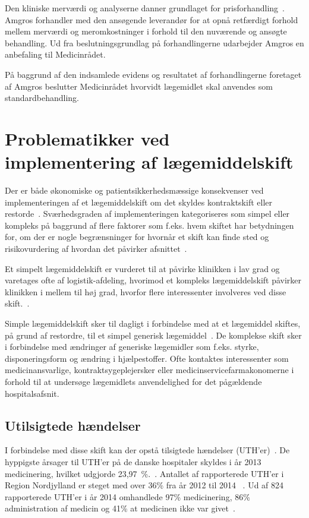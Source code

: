 Den kliniske merværdi og analyserne danner grundlaget for prisforhandling~\citep{Amgros2017, Amgros2017a}. Amgros forhandler med den ansøgende leverandør for at opnå retfærdigt forhold mellem merværdi og meromkostninger i forhold til den nuværende og ansøgte behandling. Ud fra beslutningsgrundlag på forhandlingerne udarbejder Amgros en anbefaling til Medicinrådet.~\citep{Amgros2017, Amgros2017a}

På baggrund af den indsamlede evidens og resultatet af forhandlingerne foretaget af Amgros beslutter Medicinrådet hvorvidt lægemidlet skal anvendes som standardbehandling.~\citep{Amgros2017a} 

\section{Problematikker ved implementering af lægemiddelskift}
Der er både økonomiske og patientsikkerhedsmæssige konsekvenser ved implementeringen af et lægemiddelskift om det skyldes kontraktskift eller restorde~\citep{Amgros2015}. Sværhedsgraden af implementeringen kategoriseres som simpel eller kompleks på baggrund af flere faktorer som f.eks. hvem skiftet har betydningen for, om der er nogle begrænsninger for hvornår et skift kan finde sted og risikovurdering af hvordan det påvirker afsnittet~\citep{Sygehusapoteket2017b}.

Et simpelt lægemiddelskift er vurderet til at påvirke klinikken i lav grad og varetages ofte af logistik-afdeling, hvorimod et kompleks lægemiddelskift påvirker klinikken i mellem til høj grad, hvorfor flere interessenter involveres ved disse skift.~\citep{Laegemiddelinformaion2017,Sygehusapoteket2017a}. 

Simple lægemiddelskift sker til dagligt i forbindelse med at et lægemiddel skiftes, på grund af restordre, til et simpel generisk lægemiddel~\citep{Laegemiddelinformaion2017}. De komplekse skift sker i forbindelse med ændringer af generiske lægemidler som f.eks. styrke, disponeringsform og ændring i hjælpestoffer. Ofte kontaktes interessenter som medicinansvarlige, kontraktsygeplejersker eller medicinservicefarmakonomerne i forhold til at undersøge lægemidlets anvendelighed for det pågældende hospitalsafsnit.~\citep{Laegemiddelinformaion2017,Sygehusapoteket2017a}

\subsection{Utilsigtede hændelser}
I forbindelse med disse skift kan der opstå tilsigtede hændelser (UTH'er)~\citep{Amgros2015}. De hyppigste årsager til UTH'er på de danske hospitaler skyldes i år 2013 medicinering, hvilket udgjorde 23,97~\%.~\citep{Patientombuddet2013}. Antallet af rapporterede UTH'er i Region Nordjylland er steget med over 36\% fra år 2012 til 2014 ~\citep{Jensen2014}. Ud af 824 rapporterede UTH'er i år 2014 omhandlede 97\% medicinering, 86\% administration af medicin og 41\% at medicinen ikke var givet~\citep{Jensen2014}. 


